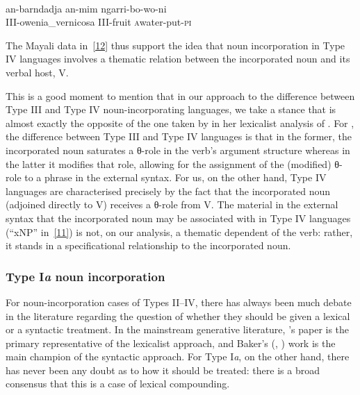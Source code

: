 \documentclass[output=paper]{langsci/langscibook}
\newcommand{\posscite}[1]{\citeauthor{#1}'s \citeyearpar{#1}}
\begin{document}
\begin{refcontext}
{\begin{exe}
     \\
    \gll an-barndadja an-mim ngarri-bo-wo-ni\label{i}\\
    III-owenia\_vernicosa III-fruit \First\textsc{a}\normalfont{-}water-put-\textsc{pi}\\
\end{exe}} The Mayali data in~\eqref{12} thus support the idea that noun
incorporation in Type IV languages involves a thematic relation between the
incorporated noun and its verbal host, V.

This is a good moment to mention that in our approach to the difference between Type III
and Type IV noun-incorporating languages, we take a stance that is almost exactly the opposite of
the one taken by \cite{rosen89} in her lexicalist analysis of . For \cite{rosen89},
the difference between Type III and Type IV languages is that in the former, the incorporated noun
saturates a θ{}-role in the verb's argument structure whereas in the latter it modifies that role, allowing
for the assignment of the (modified) θ{}-role to a phrase in the external syntax. For us, on the other
hand, Type IV languages are characterised precisely by the fact that the incorporated noun (adjoined
directly to V) receives a θ{}-role from V. The material in the external syntax that the incorporated noun
may be associated with in Type IV languages (\enquote{xNP} in~\eqref{11}) is not, on our analysis, a thematic
dependent of the verb: rather, it stands in a specificational relationship to the incorporated noun.

\subsubsection{Type I\emph{a} noun incorporation}
For noun-incorporation cases of Types II–IV, there has always been much debate in the literature
regarding the question of whether they should be given a lexical or a syntactic treatment. In the mainstream
generative literature, \posscite{rosen89} paper is the primary representative of the lexicalist
approach, and Baker’s (\citeyear{baker88}, \citeyear{baker96}) work is the main champion of the syntactic approach. For Type
I\emph{a}, on the other hand, there has never been any doubt as to how it should be treated: there is a broad
consensus that this is a case of lexical compounding.


\end{refcontext}
\end{document}
